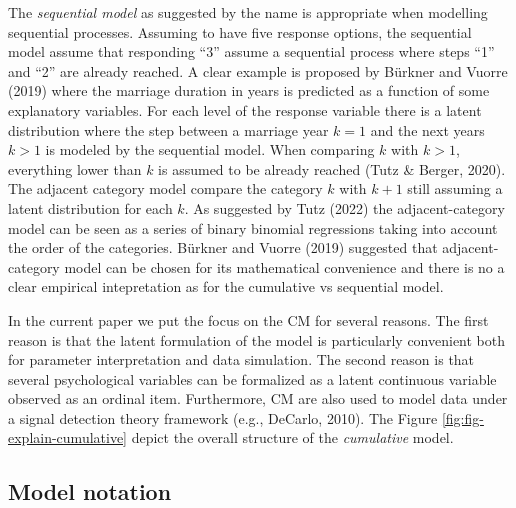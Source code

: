 \documentclass[
  man,floatsintext]{apa6}
\begin{document}
The \emph{sequential model} as suggested by the name is appropriate when modelling sequential processes. Assuming to have five response options, the sequential model assume that responding ``3'' assume a sequential process where steps ``1'' and ``2'' are already reached. A clear example is proposed by Bürkner and Vuorre (2019) where the marriage duration in years is predicted as a function of some explanatory variables. For each level of the response variable there is a latent distribution where the step between a marriage year \(k = 1\) and the next years \(k > 1\) is modeled by the sequential model. When comparing \(k\) with \(k > 1\), everything lower than \(k\) is assumed to be already reached (Tutz \& Berger, 2020). The adjacent category model compare the category \(k\) with \(k + 1\) still assuming a latent distribution for each \(k\). As suggested by Tutz (2022) the adjacent-category model can be seen as a series of binary binomial regressions taking into account the order of the categories. Bürkner and Vuorre (2019) suggested that adjacent-category model can be chosen for its mathematical convenience and there is no a clear empirical intepretation as for the cumulative vs sequential model.

In the current paper we put the focus on the CM for several reasons. The first reason is that the latent formulation of the model is particularly convenient both for parameter interpretation and data simulation. The second reason is that several psychological variables can be formalized as a latent continuous variable observed as an ordinal item. Furthermore, CM are also used to model data under a signal detection theory framework (e.g., DeCarlo, 2010). The Figure \ref{fig:fig-explain-cumulative} depict the overall structure of the \emph{cumulative} model.

\subsection{Model notation}\label{model-notation}
\end{document}
